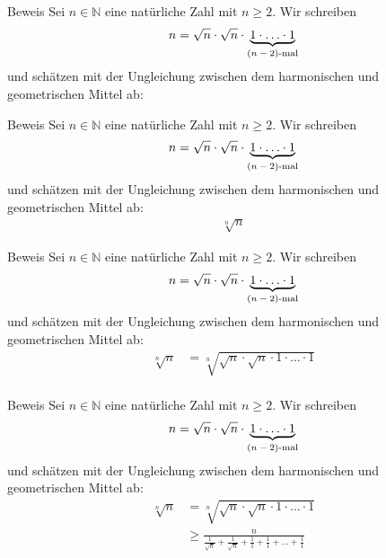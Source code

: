 \documentclass[10pt]{beamer}
\def\bN{\mathbb{N}}
\begin{document}
\begin{frame}{Beweis}
    Sei \( n \in \bN \) eine natürliche Zahl mit \( n \geq 2 \). Wir schreiben
    \[ 
        n = \sqrt{n} \cdot \sqrt{n} \cdot \underbrace{1 \cdot \ldots \cdot 1}_{\text{\( \left( n - 2 \right) \)-mal}} 
    \] 
    und schätzen mit der Ungleichung zwischen dem harmonischen und geometrischen Mittel ab:
\end{frame}



\begin{frame}{Beweis}
    Sei \( n \in \bN \) eine natürliche Zahl mit \( n \geq 2 \). Wir schreiben
    \[ 
        n = \sqrt{n} \cdot \sqrt{n} \cdot \underbrace{1 \cdot \ldots \cdot 1}_{\text{\( \left( n - 2 \right) \)-mal}} 
    \] 
    und schätzen mit der Ungleichung zwischen dem harmonischen und geometrischen Mittel ab:
    \begin{align*}
        \sqrt[n]{n}
    \end{align*}
\end{frame}



\begin{frame}{Beweis}
    Sei \( n \in \bN \) eine natürliche Zahl mit \( n \geq 2 \). Wir schreiben
    \[ 
        n = \sqrt{n} \cdot \sqrt{n} \cdot \underbrace{1 \cdot \ldots \cdot 1}_{\text{\( \left( n - 2 \right) \)-mal}} 
    \] 
    und schätzen mit der Ungleichung zwischen dem harmonischen und geometrischen Mittel ab:
    \begin{align*}
        \sqrt[n]{n}
        & = \sqrt[n]{\sqrt{n} \cdot \sqrt{n} \cdot 1 \cdot \ldots \cdot 1} \\
    \end{align*}
\end{frame}



\begin{frame}{Beweis}
    Sei \( n \in \bN \) eine natürliche Zahl mit \( n \geq 2 \). Wir schreiben
    \[ 
        n = \sqrt{n} \cdot \sqrt{n} \cdot \underbrace{1 \cdot \ldots \cdot 1}_{\text{\( \left( n - 2 \right) \)-mal}} 
    \] 
    und schätzen mit der Ungleichung zwischen dem harmonischen und geometrischen Mittel ab:
    \begin{align*}
        \sqrt[n]{n}
        & = \sqrt[n]{\sqrt{n} \cdot \sqrt{n} \cdot 1 \cdot \ldots \cdot 1} \\
        & \geq \frac{n}{\frac{1}{\sqrt{n}} + \frac{1}{\sqrt{n}} + \frac{1}{1} + \frac{1}{1} + \ldots + \frac{1}{1}} \\
    \end{align*}
\end{frame}
\end{document}
